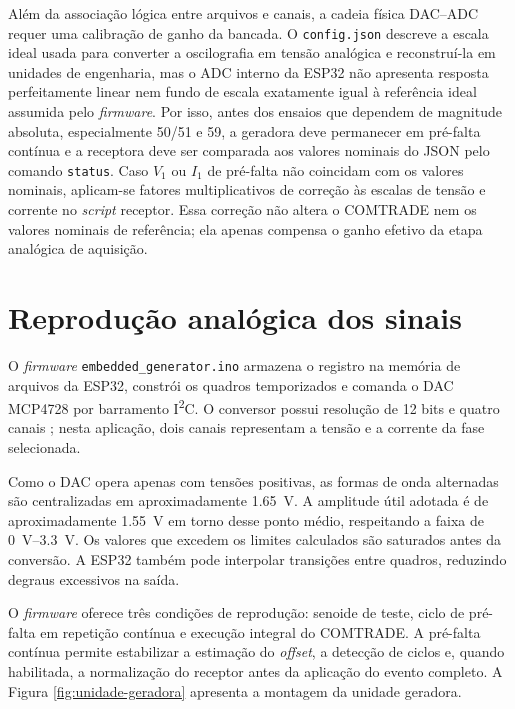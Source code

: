 Além da associação lógica entre arquivos e canais, a cadeia física DAC--ADC requer uma calibração de ganho da bancada. O \texttt{config.json} descreve a escala ideal usada para converter a oscilografia em tensão analógica e reconstruí-la em unidades de engenharia, mas o ADC interno da ESP32 não apresenta resposta perfeitamente linear nem fundo de escala exatamente igual à referência ideal assumida pelo \textit{firmware}. Por isso, antes dos ensaios que dependem de magnitude absoluta, especialmente 50/51 e 59, a geradora deve permanecer em pré-falta contínua e a receptora deve ser comparada aos valores nominais do JSON pelo comando \texttt{status}. Caso $V_1$ ou $I_1$ de pré-falta não coincidam com os valores nominais, aplicam-se fatores multiplicativos de correção às escalas de tensão e corrente no \textit{script} receptor. Essa correção não altera o COMTRADE nem os valores nominais de referência; ela apenas compensa o ganho efetivo da etapa analógica de aquisição.

\section{Reprodução analógica dos sinais}

O \textit{firmware} \texttt{embedded\_\allowbreak generator.ino} armazena o registro na memória de arquivos da ESP32, constrói os quadros temporizados e comanda o DAC MCP4728 por barramento I\textsuperscript{2}C. O conversor possui resolução de 12 bits e quatro canais \cite{microchip_mcp4728}; nesta aplicação, dois canais representam a tensão e a corrente da fase selecionada.

Como o DAC opera apenas com tensões positivas, as formas de onda alternadas são centralizadas em aproximadamente \SI{1,65}{\volt}. A amplitude útil adotada é de aproximadamente \SI{1,55}{\volt} em torno desse ponto médio, respeitando a faixa de \SIrange{0}{3,3}{\volt}. Os valores que excedem os limites calculados são saturados antes da conversão. A ESP32 também pode interpolar transições entre quadros, reduzindo degraus excessivos na saída.

O \textit{firmware} oferece três condições de reprodução: senoide de teste, ciclo de pré-falta em repetição contínua e execução integral do COMTRADE. A pré-falta contínua permite estabilizar a estimação do \textit{offset}, a detecção de ciclos e, quando habilitada, a normalização do receptor antes da aplicação do evento completo. A Figura \ref{fig:unidade-geradora} apresenta a montagem da unidade geradora.

